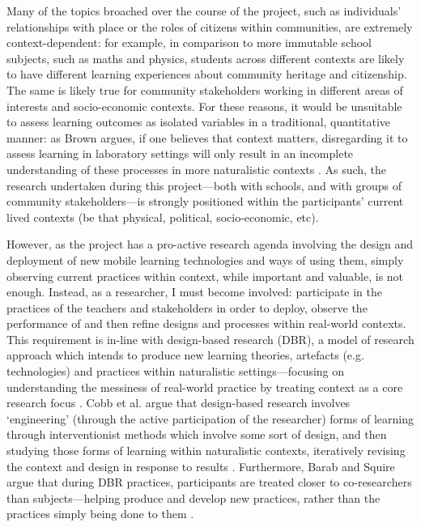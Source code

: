 Many of the topics broached over the course of the project, such as individuals' relationships with place or the roles of citizens within communities, are extremely context-dependent: for example, in comparison to more immutable school subjects, such as maths and physics, students across different contexts are likely to have different learning experiences about community heritage and citizenship. The same is likely true for community stakeholders working in different areas of interests and socio-economic contexts. For these reasons, it would be unsuitable to assess learning outcomes as isolated variables in a traditional, quantitative manner: as Brown argues, if one believes that context matters, disregarding it to assess learning in laboratory settings will only result in an incomplete understanding of these processes in more naturalistic contexts \citep{brown1992}. As such, the research undertaken during this project---both with schools, and with groups of community stakeholders---is strongly positioned within the participants' current lived contexts (be that physical, political, socio-economic, etc).

However, as the project has a pro-active research agenda involving the design and deployment of new mobile learning technologies and ways of using them, simply observing current practices within context, while important and valuable, is not enough. Instead, as a researcher, I must become involved: participate in the practices of the teachers and stakeholders in order to deploy, observe the performance of and then refine designs and processes within real-world contexts. This requirement is in-line with design-based research (DBR), a model of research approach which intends to produce new learning theories, artefacts (e.g. technologies) and practices within naturalistic settings---focusing on understanding the messiness of real-world practice by treating context as a core research focus \citep{Barab2004}. Cobb et al. argue that design-based research involves `engineering' (through the active participation of the researcher) forms of learning through interventionist methods which involve some sort of design, and then studying those forms of learning within naturalistic contexts, iteratively revising the context and design in response to results \citep{cobb2003}. Furthermore, Barab and Squire argue that during DBR practices, participants are treated closer to co-researchers than subjects---helping produce and develop new practices, rather than the practices simply being done to them \citep{Barab2004}.

